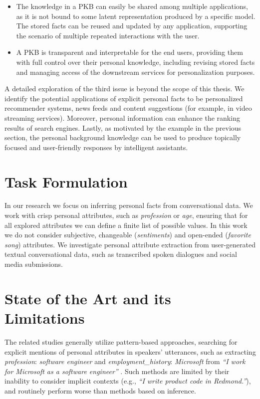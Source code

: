 \begin{itemize}
    \item The knowledge in a PKB can easily be shared among multiple applications, as it is not bound to some latent representation produced by a specific model. The stored facts can be reused and updated by any application, supporting the scenario of multiple repeated interactions with the user.
    \item A PKB is transparent and interpretable for the end users, providing them with full control over their personal knowledge, including revising stored facts and managing access of the downstream services for personalization purposes.
\end{itemize}

A detailed exploration of the third issue is beyond the scope of this thesis. We identify the potential applications of explicit personal facts to be personalized recommender systems, news feeds and content suggestions (for example, in video streaming services). Moreover, personal information can enhance the ranking results of search engines. Lastly, as motivated by the example in the previous section, the personal background knowledge can be used to produce topically focused and user-friendly responses by intelligent assistants.

\section{Task Formulation}

In our research we focus on inferring personal facts from conversational data. We work with crisp personal attributes, such as \textit{profession} or \textit{age}, ensuring that for all explored attributes we can define a finite list of possible values. In this work we do not consider subjective, changeable (\textit{sentiments}) and open-ended (\textit{favorite song}) attributes. We investigate personal attribute extraction from user-generated textual conversational data, such as transcribed spoken dialogues and social media submissions.

\section{State of the Art and its Limitations}

The related studies generally utilize pattern-based approaches, searching for explicit mentions of personal attributes in
speakers' utterances, such as extracting \textit{profession}: \textit{software engineer} and \textit{ employment\_history}: \textit{Microsoft} from \textit{``I work for Microsoft as a software engineer''} \cite{dial7}. Such methods are limited 
by their inability to consider implicit contexts (e.g., \textit{``I write product code in Redmond.''}), and routinely perform worse than methods based on inference.

